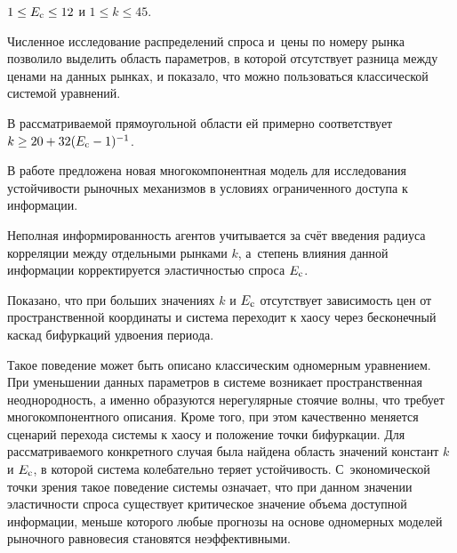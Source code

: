$1\le E_{\rm c} \le 12$ и $1 \le k \le 45 $. 

Численное исследование распределений спроса и~цены по номеру рынка позволило выделить область параметров, в которой отсутствует разница между ценами на данных рынках, и показало, что можно пользоваться классической системой уравнений. 

В рассматриваемой прямоугольной области ей примерно соответствует $k\ge 20+{32}({E_{\rm c} -1})^{-1} $.



\smallskip




В работе предложена новая многокомпонентная модель для исследования устойчивости рыночных механизмов в условиях ограниченного доступа к информации. 

Неполная информированность агентов учитывается за счёт введения радиуса корреляции между отдельными рынками $k$, а~степень влияния данной информации корректируется эластичностью спроса $E_{\rm c} $. 

Показано, что при больших значениях $k$ и $E_{\rm c} $ отсутствует зависимость цен от пространственной координаты и система переходит к хаосу через бесконечный каскад бифуркаций удвоения периода. 

Такое поведение может быть описано классическим одномерным уравнением. При уменьшении данных параметров в системе возникает пространственная неоднородность, а именно образуются нерегулярные стоячие волны, что требует многокомпонентного описания. Кроме того, при этом качественно меняется сценарий перехода системы к хаосу и положение точки бифуркации. Для рассматриваемого конкретного случая была найдена область значений констант $k$ и $E_{\rm c} $, в которой система колебательно теряет устойчивость. С~экономической точки зрения такое поведение системы означает, что при данном значении эластичности спроса существует критическое значение объема доступной информации, меньше которого любые прогнозы на основе одномерных моделей рыночного равновесия становятся неэффективными.







